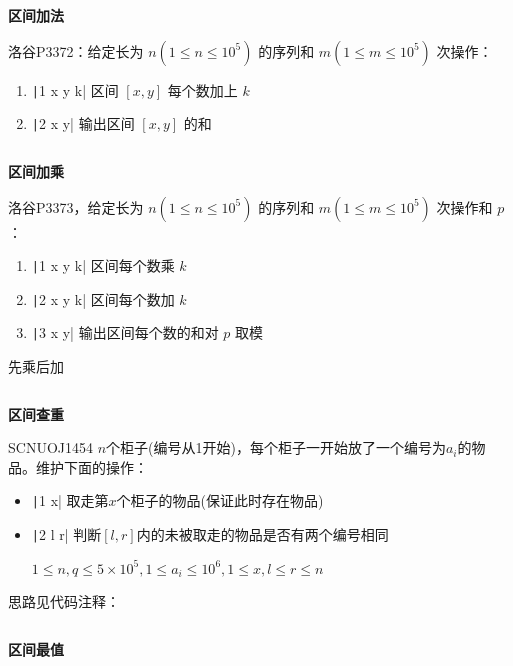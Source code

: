 \documentclass[twocolumn,10pt]{ctexart}
\makeatletter
\newcommand{\hfive}[1]{\par\addvspace{6pt}\@afterindentfalse
  {\noindent\bfseries\normalsize #1}\par\nobreak\vspace{2pt}}
\makeatother
\begin{document}
\hfive{区间加法}

\begin{notebox}
洛谷P3372：给定长为 $n(1\le n\le10^5)$ 的序列和 $m(1\le m\le10^5)$ 次操作：

\begin{enumerate}
\item \texttt|1 x y k| 区间 $[x,y]$ 每个数加上 $k$
\item \texttt|2 x y| 输出区间 $[x,y]$ 的和
\end{enumerate}
\end{notebox}

\inputminted{cpp}{code/p3372_segtree.cpp}

\hfive{区间加乘}

\begin{notebox}
洛谷P3373，给定长为 $n(1\le n\le10^5)$ 的序列和 $m(1\le m\le10^5)$ 次操作和 $p$ ：

\begin{enumerate}
\item \texttt|1 x y k| 区间每个数乘 $k$
\item \texttt|2 x y k| 区间每个数加 $k$
\item \texttt|3 x y| 输出区间每个数的和对 $p$ 取模
\end{enumerate}
\end{notebox}

先乘后加

\inputminted{cpp}{code/p3373_segtree.cpp}

\hfive{区间查重}

\begin{notebox}
SCNUOJ1454 $n$个柜子(编号从1开始)，每个柜子一开始放了一个编号为$a_i$的物品。维护下面的操作：

\begin{itemize}
\item \texttt|1 x| 取走第$x$个柜子的物品(保证此时存在物品)
\item \texttt|2 l r| 判断$[l,r]$内的未被取走的物品是否有两个编号相同

$1\le n,\allowbreak{}q\le 5\times10^5,\allowbreak{}1\le a_i\le10^6,\allowbreak{}1\le x,\allowbreak{}l\le r\le n$
\end{itemize}
\end{notebox}

思路见代码注释：

\inputminted{cpp}{code/ext_018.cpp}

\hfive{区间最值}
\end{document}
